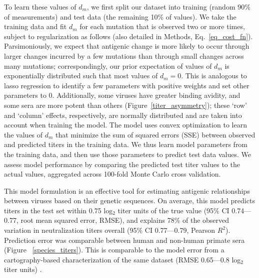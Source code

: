 \documentclass[11pt,oneside,letterpaper]{article}
\begin{document}
To learn these values of $d_m$, we first split our dataset into training (random 90\% of measurements) and test data (the remaining 10\% of values).
We take the training data and fit $d_m$ for each mutation that is observed two or more times, subject to regularization as follows (also detailed in Methods, Eq.~\ref{eq_cost_fn}).
Parsimoniously, we expect that antigenic change is more likely to occur through larger changes incurred by a few mutations than through small changes across many mutations; correspondingly, our prior expectation of values of $d_m$ is exponentially distributed such that most values of $d_m = 0$.
This is analogous to lasso regression to identify a few parameters with positive weights and set other parameters to 0.
Additionally, some viruses have greater binding avidity, and some sera are more potent than others (Figure~\ref{titer_asymmetry}); these `row' and `column' effects, respectively, are normally distributed and are taken into account when training the model.
The model uses convex optimization to learn the values of $d_m$ that minimize the sum of squared errors (SSE) between observed and predicted titers in the training data.
We thus learn model parameters from the training data, and then use those parameters to predict test data values.
We assess model performance by comparing the predicted test titer values to the actual values, aggregated across 100-fold Monte Carlo cross validation.

This model formulation is an effective tool for estimating antigenic relationships between viruses based on their genetic sequences.
On average, this model predicts titers in the test set within 0.75 log$_2$ titer units of the true value (95\% CI 0.74---0.77, root mean squared error, RMSE), and explains 78\% of the observed variation in neutralization titers overall (95\% CI 0.77---0.79, Pearson $R^2$).
Prediction error was comparable between human and non-human primate sera (Figure ~\ref{species_titers}).
This is comparable to the model error from a cartography-based characterization of the same dataset (RMSE 0.65---0.8 log$_2$ titer units) \citep{katzelnick2015dengue}.
\end{document}
